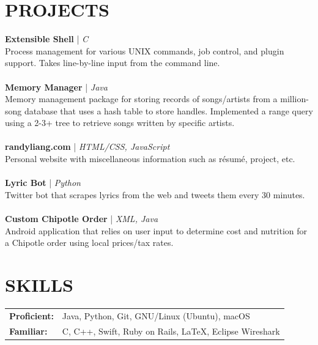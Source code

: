 \documentclass[line,margin]{res}
\begin{document}
\begin{resume}
	\section{PROJECTS}
	\textbf{Extensible Shell} | {\sl C}\\ Process management for various UNIX commands, job control, and plugin support. Takes line-by-line input from the command line.\\\\
	\textbf{Memory Manager} | {\sl Java}\\ 
	Memory management package for storing records of songs/artists from a million-song database that uses a hash table to store handles. Implemented a range query using a 2-3+ tree to retrieve songs written by specific artists.\\\\
	\textbf{randyliang.com} | {\sl HTML/CSS, JavaScript}\\ Personal website with miscellaneous information such as r\'esum\'e, project, etc.\\\\
	\textbf{Lyric Bot} | {\sl Python}\\ Twitter bot that scrapes lyrics from the web and tweets them every 30 minutes.\\\\
	\textbf{Custom Chipotle Order} | {\sl XML, Java}\\ Android application that relies on user input to determine cost and nutrition for a Chipotle order using local prices/tax rates.
	\section{SKILLS}
	\begin{tabular}{@{}ll}
		\textbf{Proficient:} & Java, Python, Git, GNU/Linux (Ubuntu), macOS            \\
		\textbf{Familiar:}   & C, C++, Swift, Ruby on Rails, \LaTeX, Eclipse Wireshark \\		
	\end{tabular} 
	\vspace{10mm}
\end{resume}
\end{document}
